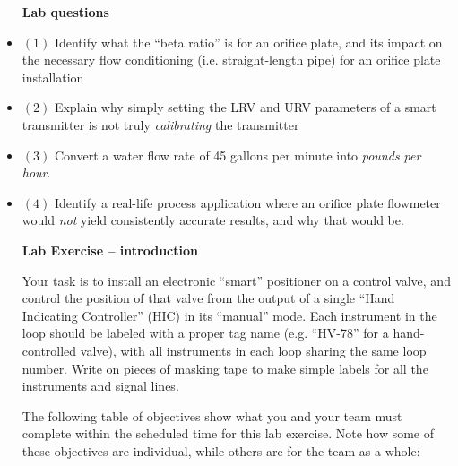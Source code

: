 \begin{itemize}
\noindent
{\bf Lab questions}

\vskip 20pt

\item{$(1)$} Identify what the ``beta ratio'' is for an orifice plate, and its impact on the necessary flow conditioning (i.e. straight-length pipe) for an orifice plate installation

\vskip 20pt

\item{$(2)$} Explain why simply setting the LRV and URV parameters of a smart transmitter is not truly {\it calibrating} the transmitter

\vskip 20pt

\item{$(3)$} Convert a water flow rate of 45 gallons per minute into {\it pounds per hour}.

\vskip 20pt

\item{$(4)$} Identify a real-life process application where an orifice plate flowmeter would {\it not} yield consistently accurate results, and why that would be.
 








\noindent
{\bf Lab Exercise -- introduction}

\vskip 5pt

Your task is to install an electronic ``smart'' positioner on a control valve, and control the position of that valve from the output of a single ``Hand Indicating Controller'' (HIC) in its ``manual'' mode.  Each instrument in the loop should be labeled with a proper tag name (e.g. ``HV-78'' for a hand-controlled valve), with all instruments in each loop sharing the same loop number.  Write on pieces of masking tape to make simple labels for all the instruments and signal lines.

The following table of objectives show what you and your team must complete within the scheduled time for this lab exercise.  Note how some of these objectives are individual, while others are for the team as a whole:


\end{itemize}
